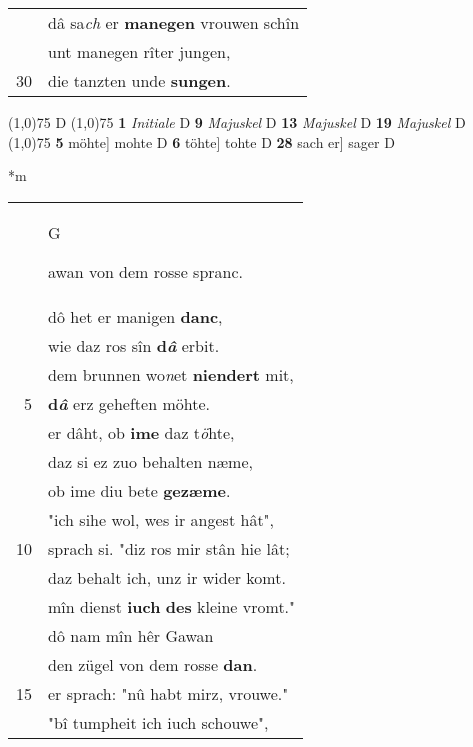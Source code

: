 \documentclass[8pt,a4paper,notitlepage]{article}
\begin{document}
\begin{table}[ht]
\begin{minipage}[t]{0.5\linewidth}
\begin{tabular}{rl}
 & dâ sa\textit{ch} er \textbf{manegen} vrouwen schîn\\ 
 & unt manegen rîter jungen,\\ 
30 & die tanzten unde \textbf{sungen}.\\ 
\end{tabular}
\scriptsize
\line(1,0){75} \newline
D \newline
\line(1,0){75} \newline
\textbf{1} \textit{Initiale} D  \textbf{9} \textit{Majuskel} D  \textbf{13} \textit{Majuskel} D  \textbf{19} \textit{Majuskel} D  \newline
\line(1,0){75} \newline
\textbf{5} möhte] mohte D \textbf{6} töhte] tohte D \textbf{28} sach er] sager D \newline
\end{minipage}
\hspace{0.5cm}
\begin{minipage}[t]{0.5\linewidth}
\small
\begin{center}*m
\end{center}
\begin{tabular}{rl}
 & \begin{large}G\end{large}awan von dem rosse spranc.\\ 
 & dô het er manigen \textbf{danc},\\ 
 & wie daz ros sîn \textbf{d\textit{â}} erbit.\\ 
 & dem brunnen wo\textit{n}et \textbf{niendert} mit,\\ 
5 & \textbf{d\textit{â}} erz geheften möhte.\\ 
 & er dâht, ob \textbf{ime} daz t\textit{ö}hte,\\ 
 & daz si ez zuo behalten næme,\\ 
 & ob ime diu bete \textbf{gezæme}.\\ 
 & "ich sihe wol, wes ir angest hât",\\ 
10 & sprach si. "diz ros mir stân hie lât;\\ 
 & daz behalt ich, unz ir wider komt.\\ 
 & mîn dienst \textbf{iuch} \textbf{des} kleine vromt."\\ 
 & dô nam mîn hêr Gawan\\ 
 & den zügel von dem rosse \textbf{dan}.\\ 
15 & er sprach: "nû habt mirz, vrouwe."\\ 
 & "bî tumpheit ich iuch schouwe",\\ 

\end{tabular}
\end{minipage}
\end{table}
\end{document}
